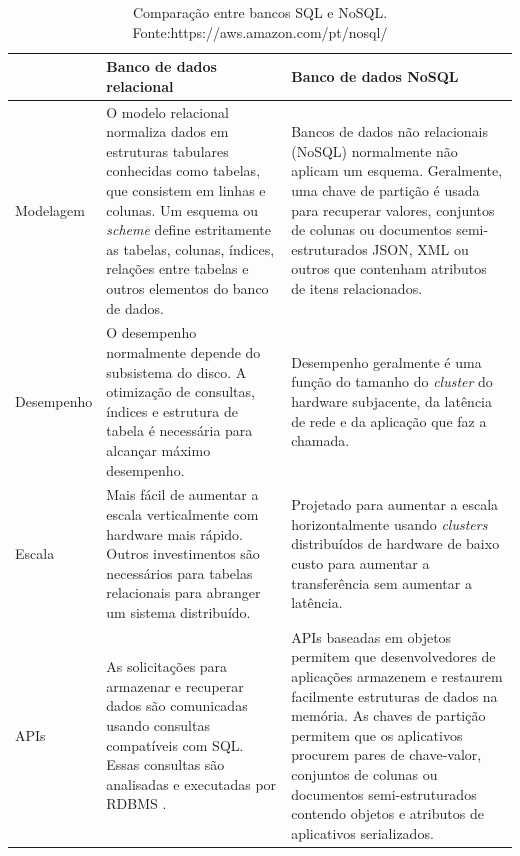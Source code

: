\begin{table}[H]
	\label{tabela-sql-nosql}
	\begin{tabular}{|m{2.5cm}|m{6cm}|m{6cm}|}
		 \hline	
		& Banco de dados relacional                                                                                                                                                                                                                            & Banco de dados NoSQL                                                                                                                                                                                                                                                                                                                \\ \hline 
		Modelagem   & O modelo relacional normaliza dados em estruturas tabulares conhecidas como tabelas, que consistem em linhas e colunas. Um esquema ou \textit{scheme} define estritamente as tabelas, colunas, índices, relações entre tabelas e outros elementos do banco de dados.     & Bancos de dados não relacionais (NoSQL) normalmente não aplicam um esquema. Geralmente, uma chave de partição é usada para recuperar valores, conjuntos de colunas ou documentos semi-estruturados JSON, XML ou outros que contenham atributos de itens relacionados.                                                                  \\ \hline 
		Desempenho  & O desempenho normalmente depende do subsistema do disco. A otimização de consultas, índices e estrutura de tabela é necessária para alcançar máximo desempenho.                                                                                      & Desempenho geralmente é uma função do tamanho do \textit{cluster} do hardware subjacente, da latência de rede e da aplicação que faz a chamada.  \\ \hline 
		Escala      & Mais fácil de aumentar a escala verticalmente com hardware mais rápido. Outros investimentos são necessários para tabelas relacionais para abranger um sistema distribuído.                                                                        & Projetado para aumentar a escala horizontalmente usando \textit{clusters} distribuídos de hardware de baixo custo para aumentar a transferência sem aumentar a latência.                                \\ \hline 
		APIs & As solicitações para armazenar e recuperar dados são comunicadas usando consultas compatíveis com SQL. Essas consultas são analisadas e executadas por \ac{RDBMS} . & APIs baseadas em objetos permitem que desenvolvedores de aplicações armazenem e restaurem facilmente estruturas de dados na memória. As chaves de partição permitem que os aplicativos procurem pares de chave-valor, conjuntos de colunas ou documentos semi-estruturados contendo objetos e atributos de aplicativos serializados. \\ \hline 
	\end{tabular}
		\caption{Comparação entre bancos SQL e NoSQL. Fonte:https://aws.amazon.com/pt/nosql/}
\end{table}

